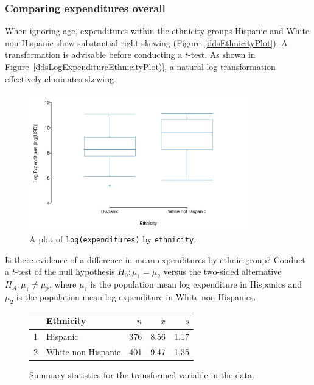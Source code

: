 \subsubsection{Comparing expenditures overall}

When ignoring age, expenditures within the ethnicity groups Hispanic and White non-Hispanic show substantial right-skewing (Figure~\ref{ddsEthnicityPlot}). A transformation is advisable before conducting a $t$-test. As shown in Figure~\ref{ddsLogExpenditureEthnicityPlot)}, a natural log transformation effectively eliminates skewing. 

\begin{figure}[h]
	\centering
	\includegraphics[width=0.85\textwidth]{ch_inference_for_means_oi_biostat/figures/ddsLogExpEthnicityPlot/ddsLogExpEthnicityPlot.pdf}
	\caption{A plot of \texttt{log(expenditures)} by \texttt{ethnicity}.}
	\label{ddsLogExpEthnicityPlot}
\end{figure} 

Is there evidence of a difference in mean expenditures by ethnic group? Conduct a $t$-test of the null hypothesis $H_0: \mu_1 = \mu_2$ versus the two-sided alternative $H_A: \mu_1 \neq \mu_2$, where $\mu_1$ is the population mean log expenditure in Hispanics and $\mu_2$ is the population mean log expenditure in White non-Hispanics.



\begin{figure}[ht]
\centering
\begin{tabular}{rlrrr} \hline
 & Ethnicity & $n$ & $\overline{x}$ & $s$ \\  \hline
1 & Hispanic & 376 & 8.56 & 1.17 \\ 
2 & White non Hispanic & 401 & 9.47 & 1.35 \\  \hline
\end{tabular}
\caption{Summary statistics for the transformed variable  in the  data.} 
\label{ddsLogExpenditureSummaryByEthnicity}
\end{figure}

